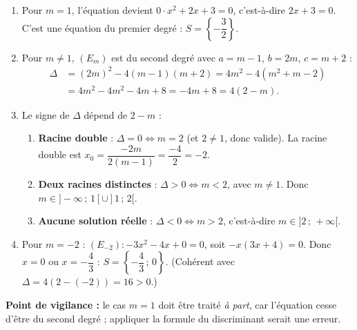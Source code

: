 \documentclass[11pt]{article}
\begin{document}
\begin{corrige}
\begin{enumerate}
    \item Pour $m = 1$, l'équation devient $0 \cdot x^2 + 2x + 3 = 0$, c'est-à-dire $2x + 3 = 0$. C'est une équation du premier degré : $S = \left\{-\dfrac{3}{2}\right\}$.
    \item Pour $m \neq 1$, $(E_m)$ est du second degré avec $a = m-1$, $b = 2m$, $c = m+2$ :
    \begin{align*}
    \Delta &= (2m)^2 - 4(m-1)(m+2) = 4m^2 - 4\left(m^2 + m - 2\right) \\
    &= 4m^2 - 4m^2 - 4m + 8 = -4m + 8 = 4(2 - m).
    \end{align*}
    \item Le signe de $\Delta$ dépend de $2 - m$ :
    \begin{enumerate}
        \item \textbf{Racine double} : $\Delta = 0 \iff m = 2$ (et $2 \neq 1$, donc valide). La racine double est $x_0 = \dfrac{-2m}{2(m-1)} = \dfrac{-4}{2} = -2$.
        \item \textbf{Deux racines distinctes} : $\Delta > 0 \iff m < 2$, avec $m \neq 1$. Donc $m \in ]-\infty\,;\,1[ \cup ]1\,;\,2[$.
        \item \textbf{Aucune solution réelle} : $\Delta < 0 \iff m > 2$, c'est-à-dire $m \in ]2\,;\,+\infty[$.
    \end{enumerate}
    \item Pour $m = -2$ : $(E_{-2}) : -3x^2 - 4x + 0 = 0$, soit $-x(3x + 4) = 0$. Donc $x = 0$ ou $x = -\dfrac{4}{3}$ : $S = \left\{-\dfrac{4}{3}\,;\,0\right\}$. (Cohérent avec $\Delta = 4(2-(-2)) = 16 > 0$.)
\end{enumerate}
\textbf{Point de vigilance :} le cas $m = 1$ doit être traité \emph{à part}, car l'équation cesse d'être du second degré ; appliquer la formule du discriminant serait une erreur.
\end{corrige}
\end{document}
